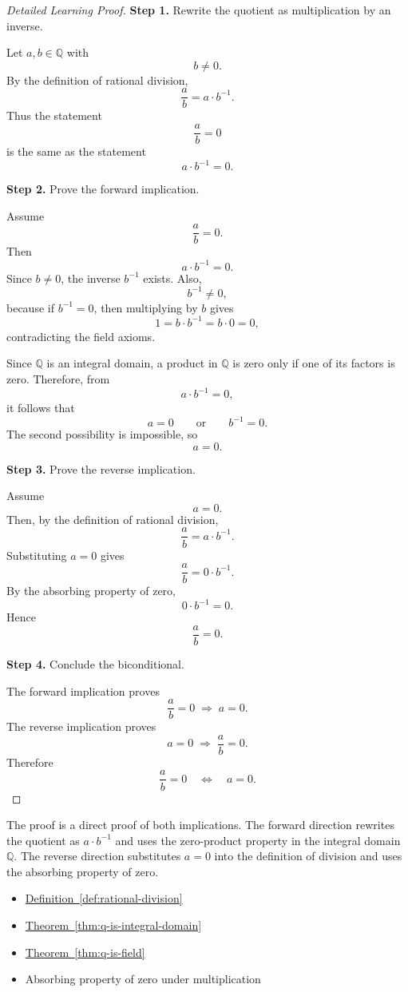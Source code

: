 \begin{proof}[Detailed Learning Proof]
\LRAProofBodyStart

\textbf{Step 1.} Rewrite the quotient as multiplication by an inverse.

Let $a,b\in\mathbb{Q}$ with
\[
b\neq 0.
\]
By the definition of rational division,
\[
\frac{a}{b}=a\cdot b^{-1}.
\]
Thus the statement
\[
\frac{a}{b}=0
\]
is the same as the statement
\[
a\cdot b^{-1}=0.
\]

\textbf{Step 2.} Prove the forward implication.

Assume
\[
\frac{a}{b}=0.
\]
Then
\[
a\cdot b^{-1}=0.
\]
Since $b\neq 0$, the inverse $b^{-1}$ exists. Also,
\[
b^{-1}\neq 0,
\]
because if $b^{-1}=0$, then multiplying by $b$ gives
\[
1=b\cdot b^{-1}=b\cdot 0=0,
\]
contradicting the field axioms.

Since $\mathbb{Q}$ is an integral domain, a product in $\mathbb{Q}$ is
zero only if one of its factors is zero. Therefore, from
\[
a\cdot b^{-1}=0,
\]
it follows that
\[
a=0
\qquad\text{or}\qquad
b^{-1}=0.
\]
The second possibility is impossible, so
\[
a=0.
\]

\textbf{Step 3.} Prove the reverse implication.

Assume
\[
a=0.
\]
Then, by the definition of rational division,
\[
\frac{a}{b}=a\cdot b^{-1}.
\]
Substituting $a=0$ gives
\[
\frac{a}{b}=0\cdot b^{-1}.
\]
By the absorbing property of zero,
\[
0\cdot b^{-1}=0.
\]
Hence
\[
\frac{a}{b}=0.
\]

\textbf{Step 4.} Conclude the biconditional.

The forward implication proves
\[
\frac{a}{b}=0 \;\Longrightarrow\; a=0.
\]
The reverse implication proves
\[
a=0 \;\Longrightarrow\; \frac{a}{b}=0.
\]
Therefore
\[
\frac{a}{b}=0
\quad\Longleftrightarrow\quad
a=0.
\]
\end{proof}

\begin{remark*}
The proof is a direct proof of both implications. The forward direction
rewrites the quotient as $a\cdot b^{-1}$ and uses the zero-product
property in the integral domain $\mathbb{Q}$. The reverse direction
substitutes $a=0$ into the definition of division and uses the absorbing
property of zero.
\end{remark*}

\begin{dependencies}
\begin{itemize}
  \item \hyperref[def:rational-division]{Definition~\ref*{def:rational-division}}
  \item \hyperref[thm:q-is-integral-domain]{Theorem~\ref*{thm:q-is-integral-domain}}
  \item \hyperref[thm:q-is-field]{Theorem~\ref*{thm:q-is-field}}
  \item Absorbing property of zero under multiplication
\end{itemize}
\end{dependencies}

\clearpage
